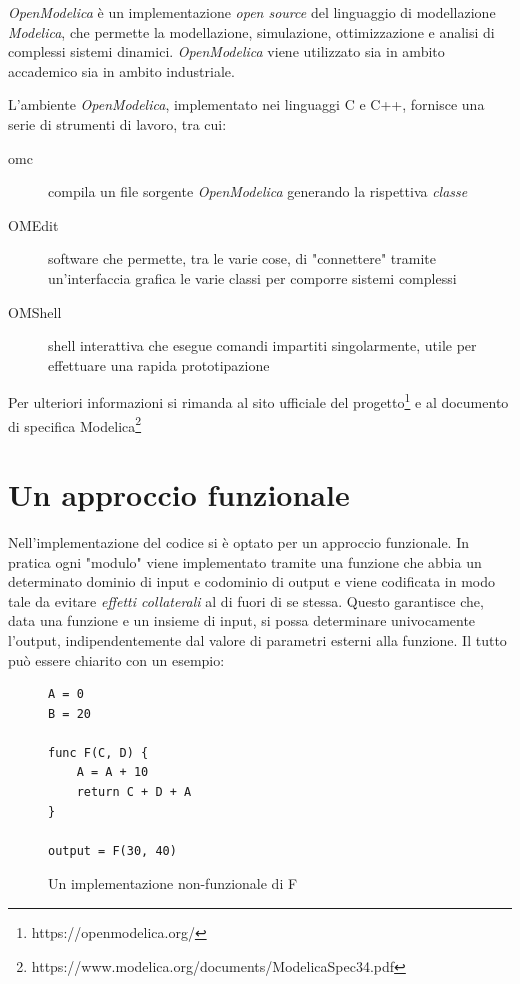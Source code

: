 \documentclass[11pt,a4paper]{report}
\newcommand{\name}[1]{{\ttfamily #1}}
\begin{document}
\textit{OpenModelica} è un implementazione \textit{open source} del linguaggio di modellazione \textit{Modelica}, che permette la modellazione, simulazione, ottimizzazione e analisi di complessi sistemi dinamici. \textit{OpenModelica} viene utilizzato sia in ambito accademico sia in ambito industriale.

L'ambiente \textit{OpenModelica}, implementato nei linguaggi C e C++, fornisce una serie di strumenti di lavoro, tra cui:

\begin{description}
	\item[omc] compila un file sorgente \textit{OpenModelica} generando la rispettiva \textit{classe}
	\item[OMEdit] software che permette, tra le varie cose, di "connettere" tramite un'interfaccia grafica le varie classi per comporre sistemi complessi
	\item[OMShell] shell interattiva che esegue comandi impartiti singolarmente, utile per effettuare una rapida prototipazione
\end{description}

Per ulteriori informazioni si rimanda al sito ufficiale del progetto\footnote{https://openmodelica.org/} e al documento di specifica Modelica\footnote{https://www.modelica.org/documents/ModelicaSpec34.pdf}

\section{Un approccio funzionale}

Nell'implementazione del codice si è optato per un approccio funzionale. In pratica ogni "modulo" viene implementato tramite una funzione che abbia un determinato dominio di input e codominio di output e viene codificata in modo tale da evitare \textit{effetti collaterali} al di fuori di se stessa. Questo garantisce che, data una funzione e un insieme di input, si possa determinare univocamente l'output, indipendentemente dal valore di parametri esterni alla funzione. Il tutto può essere chiarito con un esempio:

\begin{figure}[H]
\begin{lstlisting}
A = 0
B = 20

func F(C, D) {
	A = A + 10
	return C + D + A
}

output = F(30, 40)
\end{lstlisting}
\caption{Un implementazione non-funzionale di \name{F}}
\end{figure}
\end{document}
